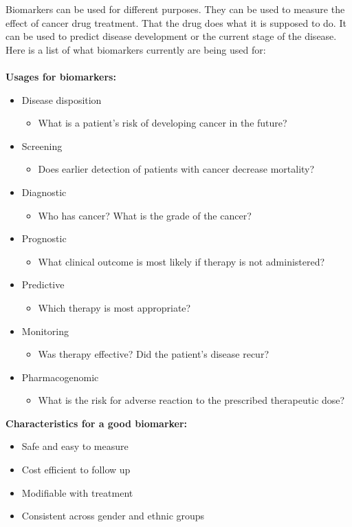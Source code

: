 \documentclass[UKenglish]{ifimaster}
\begin{document}
Biomarkers can be used for different purposes. They can be used to measure the
effect of cancer drug treatment. That the drug does what it is supposed to do.
It can be used to predict disease development or the current stage of the
disease.  Here is a list of what biomarkers currently are being used for:
\\\\
\textbf{Usages for biomarkers:} \cite{beyondpsa}
\begin{itemize}
    \item Disease disposition
        \begin{itemize}
            \item What is a patient's risk of developing cancer in the future?
        \end{itemize}
    \item Screening
        \begin{itemize}
            \item Does earlier detection of patients with cancer decrease
                mortality?
        \end{itemize}
    \item Diagnostic
        \begin{itemize}
            \item Who has cancer? What is the grade of the cancer?
        \end{itemize}
    \item Prognostic
        \begin{itemize}
            \item What clinical outcome is most likely if therapy is not
                administered?
        \end{itemize}
    \item Predictive
        \begin{itemize}
            \item Which therapy is most appropriate?
        \end{itemize}
    \item Monitoring
        \begin{itemize}
            \item Was therapy effective? Did the patient's disease recur?
        \end{itemize}
    \item Pharmacogenomic
        \begin{itemize}
            \item What is the risk for adverse reaction to the prescribed
                therapeutic dose?
        \end{itemize}
\end{itemize}
\textbf{Characteristics for a good biomarker:}
\begin{itemize}
    \item Safe and easy to measure
    \item Cost efficient to follow up
    \item Modifiable with treatment
    \item Consistent across gender and ethnic groups
\end{itemize}
\end{document}
